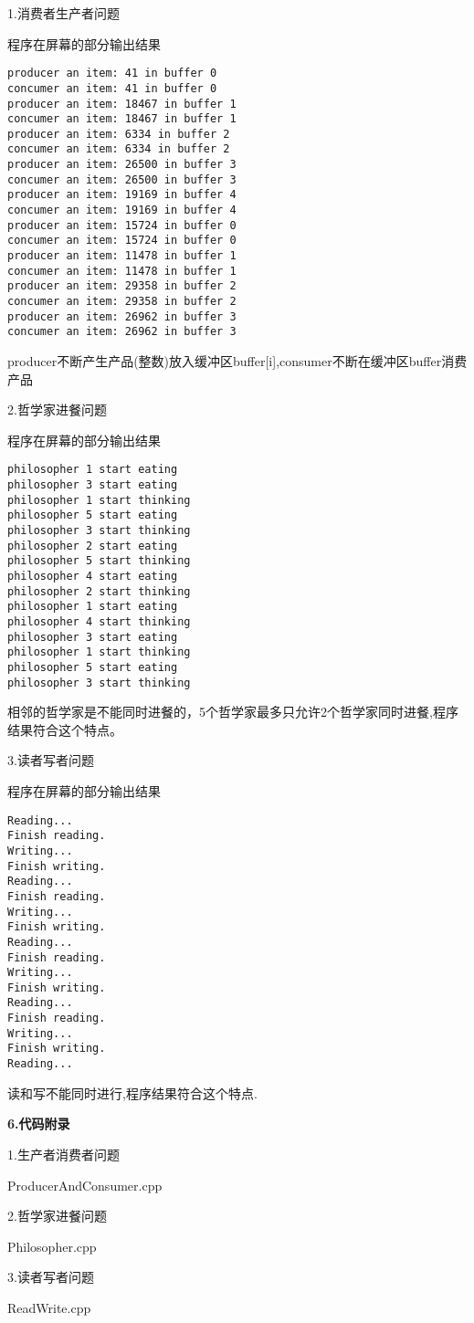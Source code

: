 \documentclass[UTF8,a4paper]{ctexart}
\begin{document}
\noindent 1.消费者生产者问题

\centerline{程序在屏幕的部分输出结果}
\begin{lstlisting}[frame=shadowbox,backgroundcolor=\color{white}]
producer an item: 41 in buffer 0
concumer an item: 41 in buffer 0
producer an item: 18467 in buffer 1
concumer an item: 18467 in buffer 1
producer an item: 6334 in buffer 2
concumer an item: 6334 in buffer 2
producer an item: 26500 in buffer 3
concumer an item: 26500 in buffer 3
producer an item: 19169 in buffer 4
concumer an item: 19169 in buffer 4
producer an item: 15724 in buffer 0
concumer an item: 15724 in buffer 0
producer an item: 11478 in buffer 1
concumer an item: 11478 in buffer 1
producer an item: 29358 in buffer 2
concumer an item: 29358 in buffer 2
producer an item: 26962 in buffer 3
concumer an item: 26962 in buffer 3
\end{lstlisting}

producer不断产生产品(整数)放入缓冲区buffer[i],consumer不断在缓冲区buffer消费产品

\noindent 2.哲学家进餐问题

\centerline{程序在屏幕的部分输出结果}
\begin{lstlisting}[frame=shadowbox,backgroundcolor=\color{white}]
philosopher 1 start eating
philosopher 3 start eating
philosopher 1 start thinking
philosopher 5 start eating
philosopher 3 start thinking
philosopher 2 start eating
philosopher 5 start thinking
philosopher 4 start eating
philosopher 2 start thinking
philosopher 1 start eating
philosopher 4 start thinking
philosopher 3 start eating
philosopher 1 start thinking
philosopher 5 start eating
philosopher 3 start thinking
\end{lstlisting}

相邻的哲学家是不能同时进餐的，5个哲学家最多只允许2个哲学家同时进餐,程序结果符合这个特点。

\noindent 3.读者写者问题

\centerline{程序在屏幕的部分输出结果}
\begin{lstlisting}[frame=shadowbox,backgroundcolor=\color{white}]
Reading...
Finish reading.
Writing...
Finish writing.
Reading...
Finish reading.
Writing...
Finish writing.
Reading...
Finish reading.
Writing...
Finish writing.
Reading...
Finish reading.
Writing...
Finish writing.
Reading...
\end{lstlisting}

读和写不能同时进行,程序结果符合这个特点.


       {\noindent{}\bfseries{6.代码附录}}
       
\noindent 1.生产者消费者问题 

\centerline{ProducerAndConsumer.cpp}


\noindent 2.哲学家进餐问题

\centerline{Philosopher.cpp}


\noindent 3.读者写者问题

\centerline{ReadWrite.cpp}

\end{document}
